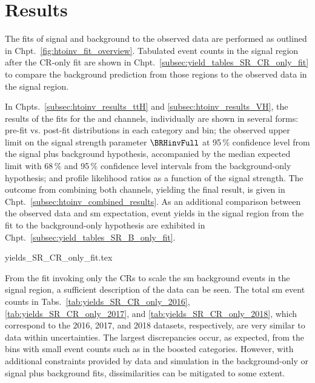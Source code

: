 \section{Results}
\label{sec:htoinv_results}

The fits of signal and background to the observed data are performed as outlined in Chpt.~\ref{fig:htoinv_fit_overview}. Tabulated event counts in the signal region after the \gls{CR}-only fit are shown in Chpt.~\ref{subsec:yield_tables_SR_CR_only_fit} to compare the background prediction from those regions to the observed data in the signal region.

In Chpts.~\ref{subsec:htoinv_results_ttH} and \ref{subsec:htoinv_results_VH}, the results of the fits for the \ttH and \VH channels, individually are shown in several forms: pre-fit vs. post-fit distributions in each category and \ptmiss bin; the observed upper limit on the signal strength parameter $\BRHinvFull$ at 95\,\% confidence level from the signal plus background hypothesis, accompanied by the median expected limit with 68\,\% and 95\,\% confidence level intervals from the background-only hypothesis; and profile likelihood ratios as a function of the signal strength. The outcome from combining both channels, yielding the final result, is given in Chpt.~\ref{subsec:htoinv_combined_results}. As an additional comparison between the observed data and \acrshort{sm} expectation, event yields in the signal region from the fit to the background-only hypothesis are exhibited in Chpt.~\ref{subsec:yield_tables_SR_B_only_fit}.




{yields_SR_CR_only_fit.tex}

From the fit invoking only the \glspl{CR} to scale the \acrlong{sm} background events in the signal region, a sufficient description of the data can be seen. The total \acrshort{sm} event counts in Tabs.~\ref{tab:yields_SR_CR_only_2016}, \ref{tab:yields_SR_CR_only_2017}, and \ref{tab:yields_SR_CR_only_2018}, which correspond to the 2016, 2017, and 2018 datasets, respectively, are very similar to data within uncertainties. The largest discrepancies occur, as expected, from the bins with small event counts such as in the \ttH boosted categories. However, with additional constraints provided by data and simulation in the background-only or signal plus background fits, dissimilarities can be mitigated to some extent.

\clearpage


